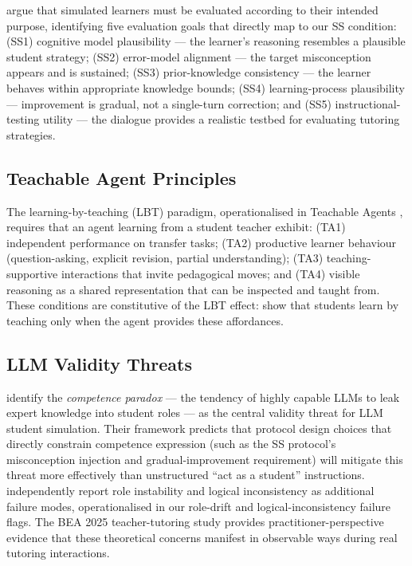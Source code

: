 \documentclass[12pt]{article}
\begin{document}
\citet{koedinger2015} argue that simulated learners must be evaluated according to their
intended purpose, identifying five evaluation goals that directly map to our SS condition:
(SS1) cognitive model plausibility --- the learner's reasoning resembles a plausible student
strategy; (SS2) error-model alignment --- the target misconception appears and is sustained;
(SS3) prior-knowledge consistency --- the learner behaves within appropriate knowledge bounds;
(SS4) learning-process plausibility --- improvement is gradual, not a single-turn correction;
and (SS5) instructional-testing utility --- the dialogue provides a realistic testbed for
evaluating tutoring strategies.

\subsection{Teachable Agent Principles}

The learning-by-teaching (LBT) paradigm, operationalised in Teachable Agents \citep{biswas2005,
blair2007}, requires that an agent learning from a student teacher exhibit: (TA1) independent
performance on transfer tasks; (TA2) productive learner behaviour (question-asking, explicit
revision, partial understanding); (TA3) teaching-supportive interactions that invite pedagogical
moves; and (TA4) visible reasoning as a shared representation that can be inspected and taught
from. These conditions are constitutive of the LBT effect: \citeauthor{biswas2005} show that
students learn by teaching only when the agent provides these affordances.

\subsection{LLM Validity Threats}

\citet{yuan2026} identify the \emph{competence paradox} --- the tendency of highly capable LLMs
to leak expert knowledge into student roles --- as the central validity threat for LLM student
simulation. Their framework predicts that protocol design choices that directly constrain
competence expression (such as the SS protocol's misconception injection and gradual-improvement
requirement) will mitigate this threat more effectively than unstructured ``act as a student''
instructions.
\citet{mannekote2025} independently report role instability and logical inconsistency as
additional failure modes, operationalised in our role-drift and logical-inconsistency failure
flags.
The BEA 2025 teacher-tutoring study \citep{bea2025_teacher} provides practitioner-perspective
evidence that these theoretical concerns manifest in observable ways during real tutoring
interactions.
\end{document}

